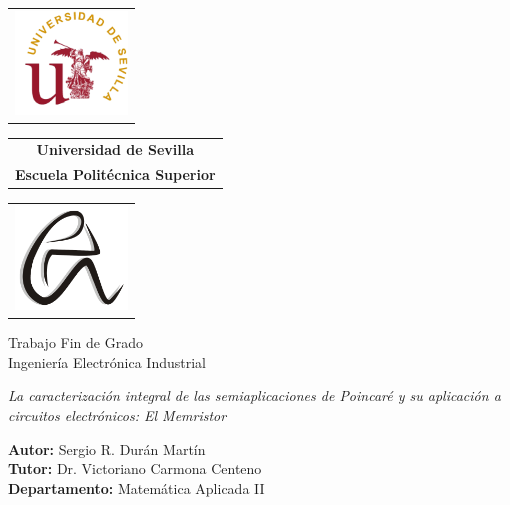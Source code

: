 \documentclass[12pt,a4paper]{report} %
\begin{document}
	
	\begin{titlepage}
		\centering
		\hspace*{-1.5cm}\begin{tabular}{@{}l@{}}
			\includegraphics[width=3cm]{b.png} %
		\end{tabular}
		\hfill
		\begin{tabular}{c}
			\LARGE\textbf{Universidad de Sevilla} \\ [0.5cm] %
			\LARGE\textbf{Escuela Politécnica Superior} %
		\end{tabular}%
		\hfill
		\begin{tabular}{@{}r@{}}
			\includegraphics[width=3cm]{a.png} %
		\end{tabular}\hspace*{-1.5cm}
		
		\vspace{1.5cm}
		
		\begin{center}
			\Large\textmd{Trabajo Fin de Grado} \\ [0.2cm] %
			\Large\textmd{Ingeniería Electrónica Industrial}
		\end{center}
		
		\vspace{2cm}
		
		\begin{center}
			\LARGE\textsl{La caracterización integral de las semiaplicaciones de Poincaré y su aplicación a circuitos electrónicos: El Memristor}
		\end{center}
		
		\vspace{7cm}
		
		\raggedright
		\large\textbf{Autor:} Sergio R. Durán Martín \\ [0.5cm]
		\large\textbf{Tutor:} Dr. Victoriano Carmona Centeno \\ [0.5cm]
		\large\textbf{Departamento:} Matemática Aplicada II
	\end{titlepage}
	
\end{document}
